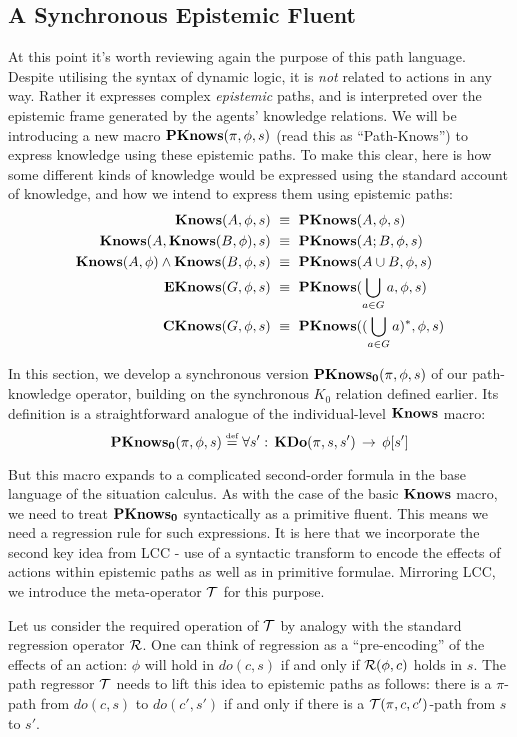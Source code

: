 \subsection{A Synchronous Epistemic Fluent\label{sub:Synchronous-Epistemic-Fluent}}

At this point it's worth reviewing again the purpose of this path
language. Despite utilising the syntax of dynamic logic, it is \emph{not}
related to actions in any way. Rather it expresses complex \emph{epistemic}
paths, and is interpreted over the epistemic frame generated by the
agents' knowledge relations. We will be introducing a new macro $\mathbf{PKnows}(\pi,\phi,s)$
(read this as {}``Path-Knows'') to express knowledge using these
epistemic paths. To make this clear, here is how some different kinds
of knowledge would be expressed using the standard account of knowledge,
and how we intend to express them using epistemic paths:\begin{align}
\mathbf{Knows}(A,\phi,s) & \,\,\equiv\,\,\mathbf{PKnows}(A,\phi,s)\nonumber \\
\mathbf{Knows}(A,\mathbf{Knows}(B,\phi),s) & \,\,\equiv\,\,\mathbf{PKnows}(A;B,\phi,s)\nonumber \\
\mathbf{Knows}(A,\phi)\wedge\mathbf{Knows}(B,\phi,s) & \,\,\equiv\,\,\mathbf{PKnows}(A\cup B,\phi,s)\nonumber \\
\mathbf{EKnows}(G,\phi,s) & \,\,\equiv\,\,\mathbf{PKnows}(\bigcup_{a\in G}a,\phi,s)\nonumber \\
\mathbf{CKnows}(G,\phi,s) & \,\,\equiv\,\,\mathbf{PKnows}((\bigcup_{a\in G}a)^{*},\phi,s)\label{eq:pknows_identities}\end{align}


In this section, we develop a synchronous version $\mathbf{PKnows_{0}}(\pi,\phi,s)$
of our path-knowledge operator, building on the synchronous $K_{0}$
relation defined earlier. Its definition is a straightforward analogue
of the individual-level $\mathbf{Knows}$ macro:\[
\mathbf{PKnows_{0}}(\pi,\phi,s)\stackrel{\mbox{\tiny def}}{=}\forall s':\,\mathbf{KDo}(\pi,s,s')\,\rightarrow\,\phi[s']\]


But this macro expands to a complicated second-order formula in the
base language of the situation calculus. As with the case of the basic
$\mathbf{Knows}$ macro, we need to treat $\mathbf{PKnows_{0}}$ syntactically as a primitive
fluent. This means we need a regression rule for such expressions.
It is here that we incorporate the second key idea from LCC - use
of a syntactic transform to encode the effects of actions within epistemic
paths as well as in primitive formulae. Mirroring LCC, we introduce
the meta-operator $\mathcal{T}$ for this purpose.

Let us consider the required operation of $\mathcal{T}$ by analogy with
the standard regression operator $\mathcal{R}$. One can think of regression
as a {}``pre-encoding'' of the effects of an action: $\phi$ will
hold in $do(c,s)$ if and only if $\mathcal{R}(\phi,c)$ holds in $s$. The
path regressor $\mathcal{T}$ needs to lift this idea to epistemic paths
as follows: there is a $\pi$-path from $do(c,s)$ to $do(c',s')$
if and only if there is a $\mathcal{T}(\pi,c,c')$-path from $s$ to $s'$.

